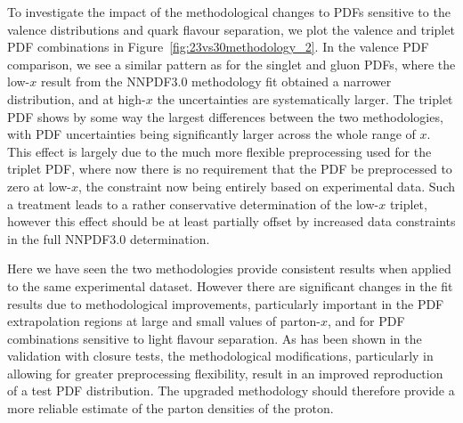 To investigate the impact of the methodological changes to PDFs sensitive to the valence distributions and quark flavour separation, we plot the valence and triplet PDF combinations in Figure~\ref{fig:23vs30methodology_2}. In the valence PDF comparison, we see a similar pattern as for the singlet and gluon PDFs, where the low-$x$ result from the NNPDF3.0 methodology fit obtained a narrower distribution, and at high-$x$ the uncertainties are systematically larger. The triplet PDF shows by some way the largest differences between the two methodologies, with PDF uncertainties being significantly larger across the whole range of $x$. This effect is largely due to the much more flexible preprocessing used for the triplet PDF, where now there is no requirement that the PDF be preprocessed to zero at low-$x$, the constraint now being entirely based on experimental data. Such a treatment leads to a rather conservative determination of the low-$x$ triplet, however this effect should be at least partially offset by increased data constraints in the full NNPDF3.0 determination.

Here we have seen the two methodologies provide consistent results when applied to the same experimental dataset. However there are significant changes in the fit results due to methodological improvements, particularly important in the PDF extrapolation regions at large and small values of parton-$x$, and for PDF combinations sensitive to light flavour separation. As has been shown in the validation with closure tests, the methodological modifications, particularly in allowing for greater preprocessing flexibility, result in an improved reproduction of a test PDF distribution. The upgraded methodology should therefore provide a more reliable estimate of the parton densities of the proton.

